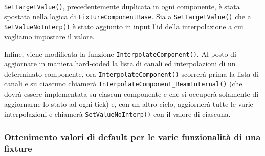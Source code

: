 \documentclass[main.tex]{subfiles}
\begin{document}
\lstinline{SetTargetValue()}, precedentemente duplicata in ogni componente, è stata spostata nella logica di \lstinline{FixtureComponentBase}. Sia a \lstinline{SetTargetValue()} che a \lstinline{SetValueNoInterp()} è stato aggiunto in input l'id della interpolazione a cui vogliamo impostare il valore. 

Infine, viene modificata la funzione \lstinline{InterpolateComponent()}. Al posto di aggiornare in maniera hard-coded la lista di canali ed interpolazioni di un determinato componente, ora \lstinline{InterpolateComponent()} scorrerà prima la lista di canali e su ciascuno chiamerà \lstinline{InterpolateComponent_BeamInternal()} (che dovrà essere implementata su ciascun componente e che si occuperà solamente di aggiornarne lo stato ad ogni tick) e, con un altro ciclo, aggiornerà tutte le varie interpolazioni e chiamerà \lstinline{SetValueNoInterp()} con il valore di ciascuna.

\subsubsection{Ottenimento valori di default per le varie funzionalità di una fixture}\label{subsec:3_1_defaultValues}
\end{document}

